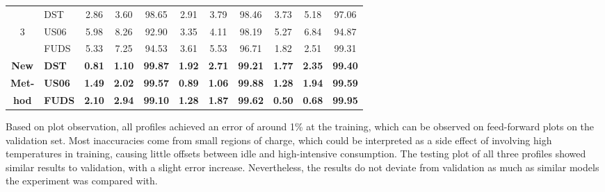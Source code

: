 {\begin{table*}[!ht]
{\begin{tabular}{ c l c c c c c c c c c}
    \hline
        & DST & 2.86 & 3.60 & 98.65 & 2.91 & 3.79 & 98.46 & 3.73 & 5.18 & 97.06 \\ 
    3 & US06 & 5.98 & 8.26 & 92.90 & 3.35 & 4.11 & 98.19 & 5.27 & 6.84 & 94.87 \\ 
        & FUDS & 5.33 & 7.25 & 94.53 & 3.61 & 5.53 & 96.71 & 1.82 & 2.51 & 99.31 \\ 
    \hline
    \textbf{New} & \textbf{DST} & \textbf{0.81} & \textbf{1.10} & \textbf{99.87} & \textbf{1.92} & \textbf{2.71} & \textbf{99.21} & \textbf{1.77} & \textbf{2.35} & \textbf{99.40}  \\
    \textbf{Met-}& \textbf{US06} & \textbf{1.49} & \textbf{2.02} & \textbf{99.57} & \textbf{0.89} & \textbf{1.06} & \textbf{99.88} & \textbf{1.28} & \textbf{1.94} & \textbf{99.59}  \\
    \textbf{hod} & \textbf{FUDS} & \textbf{2.10} & \textbf{2.94} & \textbf{99.10} & \textbf{1.28} & \textbf{1.87} & \textbf{99.62} & \textbf{0.50} & \textbf{0.68} & \textbf{99.95}  \\
    \hline\hline
\end{tabular}
}
\end{table*}
}

%
%
Based on plot observation, all profiles achieved an error of around 1\% at the training, which can be observed on feed-forward plots on the validation set.
Most inaccuracies come from small regions of charge, which could be interpreted as a side effect of involving high temperatures in training, causing little offsets between idle and high-intensive consumption.
The testing plot of all three profiles showed similar results to validation, with a slight error increase.
Nevertheless, the results do not deviate from validation as much as similar models the experiment was compared with.


